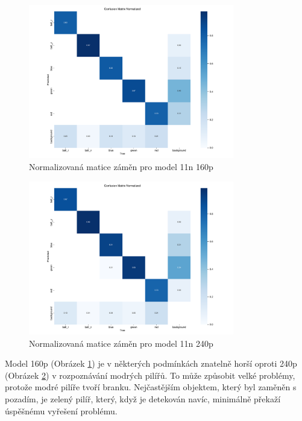 \documentclass[a4paper,12pt]{article}
\begin{document}
\begin{figure}[H]
    \centering
    \includegraphics[width=0.8\textwidth]{pictures/v11n_160p.png}
    \caption{Normalizovaná matice záměn pro model 11n 160p}
    \label{fig:confusion_matrix_160p}
\end{figure}

\begin{figure}[H]
    \centering
    \includegraphics[width=0.8\textwidth]{pictures/v11n_240p.png}
    \caption{Normalizovaná matice záměn pro model 11n 240p}
    \label{fig:confusion_matrix_240p}
\end{figure}

Model 160p (Obrázek \ref{fig:confusion_matrix_160p}) je v některých podmínkách znatelně horší oproti 240p (Obrázek \ref{fig:confusion_matrix_240p}) v rozpoznávání modrých pilířů.
To může způsobit velké problémy, protože modré pilíře tvoří branku. Nejčastějším objektem, který byl zaměněn s pozadím, je zelený pilíř, který, když je detekován navíc, minimálně překaží úspěšnému vyřešení problému.
\end{document}

